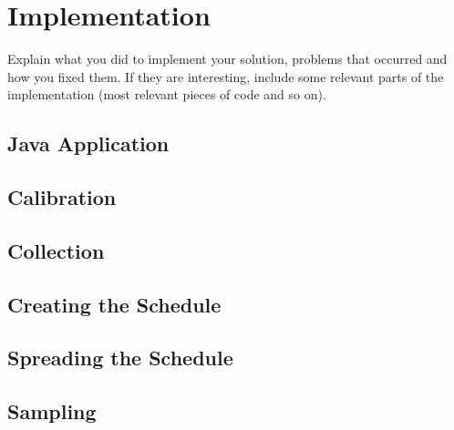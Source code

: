 \chapter{Implementation}

Explain what you did to implement your solution, problems that occurred and how you fixed them. 
If they are interesting, include some relevant parts of the implementation (most relevant pieces of code and so on). 

\section{Java Application}
\section{Calibration}
\section{Collection}
\section{Creating the Schedule}
\section{Spreading the Schedule}
\section{Sampling}